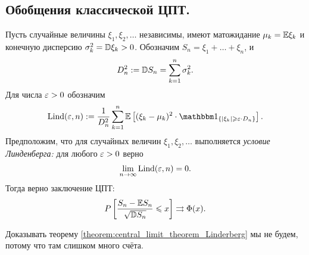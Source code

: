 \documentclass[../main.tex]{subfiles}
\begin{document}
\subsection{Обобщения классической ЦПТ.}

\newcommand{\Lind}{\ensuremath \mathrm{Lind}}

\begin{thm}
 \label{theorem:central_limit_theorem_Linderberg}
 Пусть случайные величины $ \xi_1, \xi_2, \ldots $  независимы, имеют матожидание $ \mu_k = \mathbb E \xi_k $ и конечную дисперсию $\sigma_k^{2} = \mathbb D \xi_k > 0$. Обозначим $ S_n = \xi_1 + \ldots + \xi_n $, и
 \begin{align*}
  D_n^{2} := \mathbb D S_n = \sum_{k=1}^{n} \sigma_k^{2}.
 \end{align*} Для числа $ \varepsilon > 0 $ обозначим
 \begin{align*}
  \Lind(\eps, n) := \frac{1}{D_n^{2}} \sum_{k=1}^{n} \E \left[ (\xi_k-\mu_k)^{2} \cdot \Ind_{\left\{ \left| \xi_k \right| \geqslant \eps \cdot D_n \right\}} \right].
 \end{align*} Предположим, что для случайных величин $ \xi_1,\xi_2,\ldots $ выполняется \emph{условие Линденберга:} для любого $ \varepsilon > 0 $ верно
 \begin{align}
  \label{eq:lindenberg_condition}
  \lim_{n \to \infty} \Lind(\eps, n) = 0.
 \end{align} Тогда верно заключение ЦПТ:
 \begin{align*}
  P \left[ \frac{S_n - \mathbb E S_n}{\sqrt{\mathbb D S_n}} \leqslant x \right] \rightrightarrows \Phi(x).
 \end{align*}
\end{thm}

Доказывать теорему \ref{theorem:central_limit_theorem_Linderberg} мы не будем, потому что там слишком много счёта.
\end{document}
